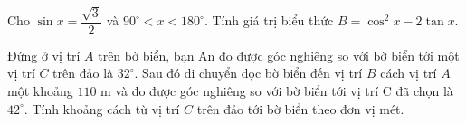 \begin{bt}%
	Cho $ \sin x=\dfrac{\sqrt{3}}{2} $ và $ 90^\circ <x<180^\circ $. Tính giá trị biểu thức $ B=\cos^2 x-2\tan x $.
\end{bt}
\begin{bt}%
	Đứng ở vị trí $ A $ trên bờ biển, bạn An đo được góc nghiêng so với bờ biển tới một vị trí $C$ trên đảo là $ 32^\circ $. Sau đó di chuyển dọc bờ biển đến vị trí $B$ cách vị trí $A$ một khoảng $ 110 $ m và đo được góc nghiêng so với bờ biển tới vị trí C đã chọn là $ 42^\circ $. Tính khoảng cách từ vị trí $C$ trên đảo tới bờ biển theo đơn vị mét.
	\begin{center}
	
\end{center}
\end{bt}
